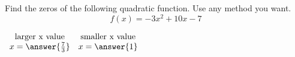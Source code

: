 \documentclass{ximera}
\author{David Kish}
\begin{document}
\begin{exercise}
Find the zeros of the following quadratic function. Use any method you want. 
\[
f(x) = -3x^2+10x - 7
\]

\begin{center}
$
\begin{array}{cc}
\text{larger x value} & \text{smaller x value}\\
x  = \answer{\frac{7}{3}} & x = \answer{1}
\end{array}
$
\end{center}
\end{exercise}
\end{document}
